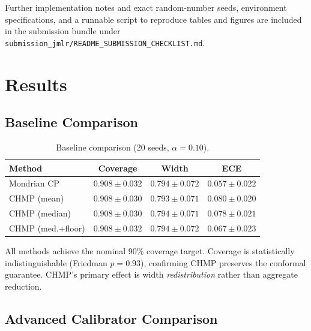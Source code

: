 \documentclass[twoside,11pt]{article}
\begin{document}
Further implementation notes and exact random-number seeds, environment
specifications, and a runnable script to reproduce tables and figures are
included in the submission bundle under \texttt{submission_jmlr/README_SUBMISSION_CHECKLIST.md}.

\section{Results}
\label{sec:results}

\subsection{Baseline Comparison}

\begin{table}[ht]
\centering
\caption{Baseline comparison (20 seeds, $\alpha = 0.10$).}
\label{tab:baseline}
\begin{tabular}{lccc}
\toprule
Method & Coverage & Width & ECE \\
\midrule
Mondrian CP & $0.908 \pm 0.032$ & $0.794 \pm 0.072$ & $0.057 \pm 0.022$ \\
CHMP (mean) & $0.908 \pm 0.030$ & $0.793 \pm 0.071$ & $0.080 \pm 0.020$ \\
CHMP (median) & $0.908 \pm 0.030$ & $0.794 \pm 0.071$ & $0.078 \pm 0.021$ \\
CHMP (med.+floor) & $0.908 \pm 0.032$ & $0.794 \pm 0.072$ & $0.067 \pm 0.023$ \\
\bottomrule
\end{tabular}
\end{table}

All methods achieve the nominal 90\% coverage target. Coverage is
statistically indistinguishable (Friedman $p = 0.93$), confirming CHMP
preserves the conformal guarantee. CHMP's primary effect is width
\emph{redistribution} rather than aggregate reduction.

\subsection{Advanced Calibrator Comparison}
\end{document}
